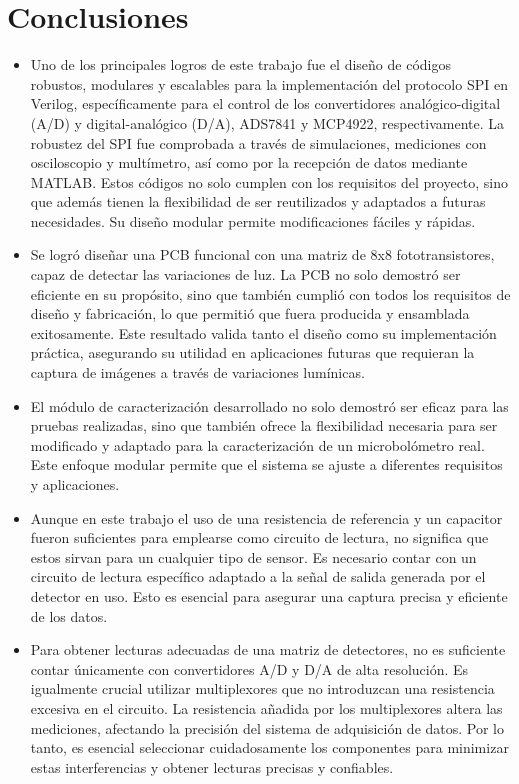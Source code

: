 \chapter{Conclusiones}

\begin{itemize}
 \item Uno de los principales logros de este trabajo fue el diseño de códigos robustos, modulares y escalables para la implementación del protocolo SPI en Verilog, específicamente para el control de los convertidores analógico-digital (A/D) y digital-analógico (D/A), ADS7841 y MCP4922, respectivamente. La robustez del SPI fue comprobada a través de simulaciones, mediciones con osciloscopio y multímetro, así como por la recepción de datos mediante MATLAB. Estos códigos no solo cumplen con los requisitos del proyecto, sino que además tienen la flexibilidad de ser reutilizados y adaptados a futuras necesidades. Su diseño modular permite modificaciones fáciles y rápidas.
 \item Se logró diseñar una PCB funcional con una matriz de 8x8 fototransistores, capaz de detectar las variaciones de luz. La PCB no solo demostró ser eficiente en su propósito, sino que también cumplió con todos los requisitos de diseño y fabricación, lo que permitió que fuera producida y ensamblada exitosamente. Este resultado valida tanto el diseño como su implementación práctica, asegurando su utilidad en aplicaciones futuras que requieran la captura de imágenes a través de variaciones lumínicas.  
 \item El módulo de caracterización desarrollado no solo demostró ser eficaz para las pruebas realizadas, sino que también ofrece la flexibilidad necesaria para ser modificado y adaptado para la caracterización de un microbolómetro real. Este enfoque modular permite que el sistema se ajuste a diferentes requisitos y aplicaciones.
 \item Aunque en este trabajo el uso de una resistencia de referencia y un capacitor fueron suficientes para emplearse como circuito de lectura, no significa que estos sirvan para un cualquier tipo de sensor. Es necesario contar con un circuito de lectura específico adaptado a la señal de salida generada por el detector en uso. Esto es esencial para asegurar una captura precisa y eficiente de los datos.
 \item Para obtener lecturas adecuadas de una matriz de detectores, no es suficiente contar únicamente con convertidores A/D y D/A de alta resolución. Es igualmente crucial utilizar multiplexores que no introduzcan una resistencia excesiva en el circuito. La resistencia añadida por los multiplexores altera las mediciones, afectando la precisión del sistema de adquisición de datos. Por lo tanto, es esencial seleccionar cuidadosamente los componentes para minimizar estas interferencias y obtener lecturas precisas y confiables.
\end{itemize}


    
